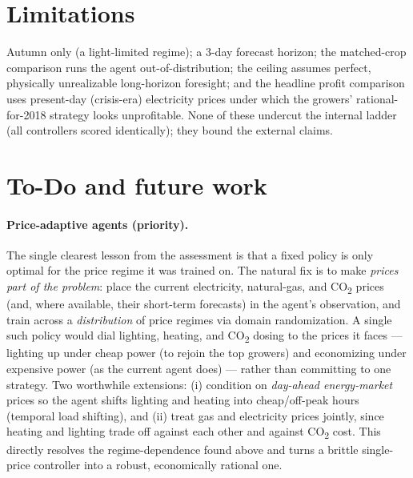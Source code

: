 \documentclass[11pt]{article}
\begin{document}
\section{Limitations}
Autumn only (a light-limited regime); a 3-day forecast horizon; the matched-crop
comparison runs the agent out-of-distribution; the ceiling assumes perfect,
physically unrealizable long-horizon foresight; and the headline profit comparison
uses present-day (crisis-era) electricity prices under which the growers'
rational-for-2018 strategy looks unprofitable. None of these undercut the internal
ladder (all controllers scored identically); they bound the external claims.

\section{To-Do and future work}

\paragraph{Price-adaptive agents (priority).} The single clearest lesson from the
assessment is that a fixed policy is only optimal for the price regime it was
trained on. The natural fix is to make \emph{prices part of the problem}: place the
current electricity, natural-gas, and CO\textsubscript{2} prices (and, where available, their
short-term forecasts) in the agent's observation, and train across a
\emph{distribution} of price regimes via domain randomization. A single such policy
would dial lighting, heating, and CO\textsubscript{2} dosing to the prices it faces --- lighting
up under cheap power (to rejoin the top growers) and economizing under expensive
power (as the current agent does) --- rather than committing to one strategy. Two
worthwhile extensions: (i) condition on \emph{day-ahead energy-market} prices so the
agent shifts lighting and heating into cheap/off-peak hours (temporal load
shifting), and (ii) treat gas and electricity prices jointly, since heating and
lighting trade off against each other and against CO\textsubscript{2} cost. This directly
resolves the regime-dependence found above and turns a brittle single-price
controller into a robust, economically rational one.
\end{document}
